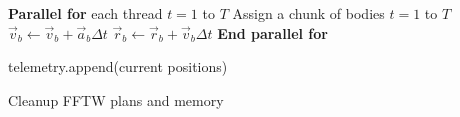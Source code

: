 \documentclass{article}
\begin{document}
\begin{algorithm}[H]
\begin{algorithmic}[1]
    \State \textbf{Parallel for} each thread $t= 1$ to $T$
        \State \quad Assign a chunk of bodies $t=1$ to $T$
                \State $\vec{v}_b \gets \vec{v}_b + \vec{a}_b \Delta t$
                \State $\vec{r}_b \gets \vec{r}_b + \vec{v}_b \Delta t$
        \EndFor
    \State \textbf{End parallel for}

    \State telemetry.append(current positions)
\EndFor

\State Cleanup FFTW plans and memory
\end{algorithmic}
\end{algorithm}
\end{document}
